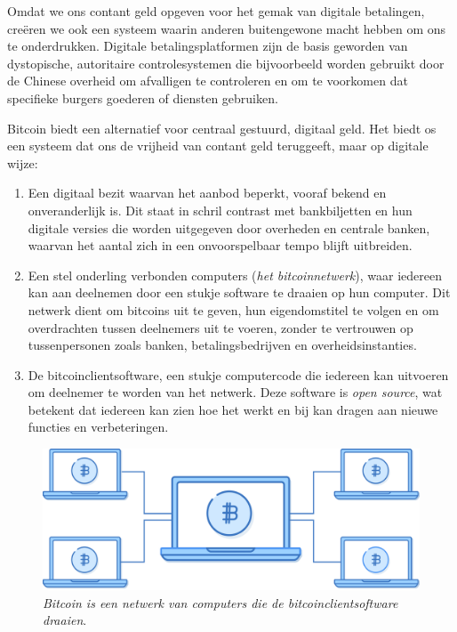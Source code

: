 \documentclass[smalldemyvopaper,11pt,twoside,onecolumn,openright,extrafontsizes]{memoir}
\begin{document}
Omdat we ons contant geld opgeven voor het gemak van digitale betalingen, creëren we ook een systeem waarin anderen buitengewone macht hebben om ons te onderdrukken. Digitale betalingsplatformen zijn de basis geworden van dystopische, autoritaire controlesystemen die bijvoorbeeld worden gebruikt door de Chinese overheid om afvalligen te controleren en om te voorkomen dat specifieke burgers goederen of diensten gebruiken. 

Bitcoin biedt een alternatief voor centraal gestuurd, digitaal geld. Het biedt os een systeem dat ons de vrijheid van contant geld teruggeeft, maar op digitale wijze: 

\begin{enumerate}
    \item Een digitaal bezit waarvan het aanbod beperkt, vooraf bekend en onveranderlijk is. Dit staat in schril contrast met bankbiljetten en hun digitale versies die worden uitgegeven door overheden en centrale banken, waarvan het aantal zich in een onvoorspelbaar tempo blijft uitbreiden.
    \item Een stel onderling verbonden computers (\textit{het bitcoinnetwerk}), waar iedereen kan aan deelnemen door een stukje software te draaien op hun computer. Dit netwerk dient om bitcoins uit te geven, hun eigendomstitel te volgen en om overdrachten tussen deelnemers uit te voeren, zonder te vertrouwen op tussenpersonen zoals banken, betalingsbedrijven en overheidsinstanties.
    \item De bitcoinclientsoftware, een stukje computercode die iedereen kan uitvoeren om deelnemer te worden van het netwerk. Deze software is \textit{open source}, wat betekent dat iedereen kan zien hoe het werkt en bij kan dragen aan nieuwe functies en verbeteringen.

\end{enumerate}
\begin{figure}
    \centering
    \includegraphics[width=\textwidth]{images/fig1.png}
    \caption{\footnotesize{\textit{Bitcoin is een netwerk van computers die de bitcoinclientsoftware draaien}.}}
    \label{fig1}
\end{figure}
\end{document}
